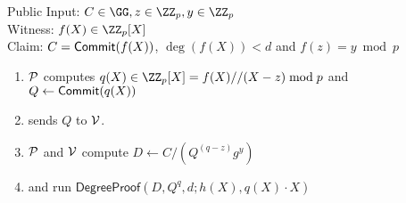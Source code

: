\documentclass[12pt]{article}
\theoremstyle{Definition}
\begin{document}
\begin{mdframed}
Public Input: $C\in \GG,z\in \ZZ_p,y\in \ZZ_p$\\
Witness: $f(X) \in \ZZ_p[X]$ \\
Claim: $C=\textsf{{Commit}}(f(X))$, $\deg(f(X))<d$ and $f(z)=y \bmod p$
	\begin{enumerate}[nolistsep]
		\item $\mathcal{P}$ computes $q(X) \in \ZZ_p[X]=f(X)//(X-z) \bmod p$ and $Q\gets\textsf{{Commit}}(q(X))$
		\item \prover sends $Q$ to $\mathcal{V}$.
		\item $\mathcal{P}$ and $\mathcal{V}$ compute $D\gets C/(Q^{(q-z)}g^y)$ 

		\item \prover and \verifier run $\textsf{DegreeProof}(D,Q^q,d;h(X),q(X)\cdot X)$
	\end{enumerate}
\end{mdframed}
\end{document}
